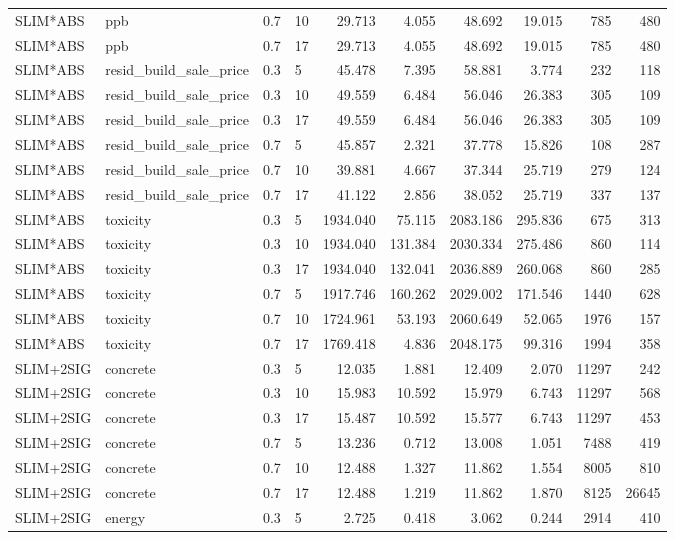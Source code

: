 \begin{longtable}{llllrrrrrr}
SLIM*ABS & ppb & 0.7 & 10 & 29.713 & 4.055 & 48.692 & 19.015 & 785 & 480 \\
SLIM*ABS & ppb & 0.7 & 17 & 29.713 & 4.055 & 48.692 & 19.015 & 785 & 480 \\
\midrule
SLIM*ABS & resid_build_sale_price & 0.3 & 5 & 45.478 & 7.395 & 58.881 & 3.774 & 232 & 118 \\
SLIM*ABS & resid_build_sale_price & 0.3 & 10 & 49.559 & 6.484 & 56.046 & 26.383 & 305 & 109 \\
SLIM*ABS & resid_build_sale_price & 0.3 & 17 & 49.559 & 6.484 & 56.046 & 26.383 & 305 & 109 \\
SLIM*ABS & resid_build_sale_price & 0.7 & 5 & 45.857 & 2.321 & 37.778 & 15.826 & 108 & 287 \\
SLIM*ABS & resid_build_sale_price & 0.7 & 10 & 39.881 & 4.667 & 37.344 & 25.719 & 279 & 124 \\
SLIM*ABS & resid_build_sale_price & 0.7 & 17 & 41.122 & 2.856 & 38.052 & 25.719 & 337 & 137 \\
\midrule
SLIM*ABS & toxicity & 0.3 & 5 & 1934.040 & 75.115 & 2083.186 & 295.836 & 675 & 313 \\
SLIM*ABS & toxicity & 0.3 & 10 & 1934.040 & 131.384 & 2030.334 & 275.486 & 860 & 114 \\
SLIM*ABS & toxicity & 0.3 & 17 & 1934.040 & 132.041 & 2036.889 & 260.068 & 860 & 285 \\
SLIM*ABS & toxicity & 0.7 & 5 & 1917.746 & 160.262 & 2029.002 & 171.546 & 1440 & 628 \\
SLIM*ABS & toxicity & 0.7 & 10 & 1724.961 & 53.193 & 2060.649 & 52.065 & 1976 & 157 \\
SLIM*ABS & toxicity & 0.7 & 17 & 1769.418 & 4.836 & 2048.175 & 99.316 & 1994 & 358 \\
\midrule
SLIM+2SIG & concrete & 0.3 & 5 & 12.035 & 1.881 & 12.409 & 2.070 & 11297 & 242 \\
SLIM+2SIG & concrete & 0.3 & 10 & 15.983 & 10.592 & 15.979 & 6.743 & 11297 & 568 \\
SLIM+2SIG & concrete & 0.3 & 17 & 15.487 & 10.592 & 15.577 & 6.743 & 11297 & 453 \\
SLIM+2SIG & concrete & 0.7 & 5 & 13.236 & 0.712 & 13.008 & 1.051 & 7488 & 419 \\
SLIM+2SIG & concrete & 0.7 & 10 & 12.488 & 1.327 & 11.862 & 1.554 & 8005 & 810 \\
SLIM+2SIG & concrete & 0.7 & 17 & 12.488 & 1.219 & 11.862 & 1.870 & 8125 & 26645 \\
\midrule
SLIM+2SIG & energy & 0.3 & 5 & 2.725 & 0.418 & 3.062 & 0.244 & 2914 & 410 \\

\end{longtable}

